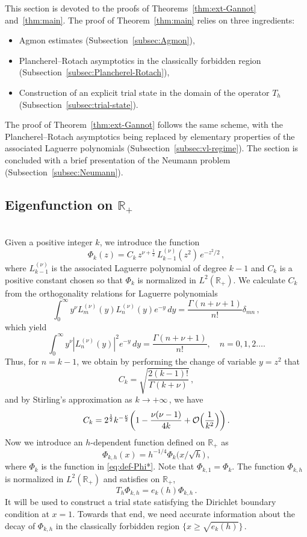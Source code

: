 \documentclass[11pt]{amsart}
\numberwithin{equation}{section}
\theoremstyle{remark}
\newcommand{\R}{\mathbb{R}}
\begin{document}
This section is devoted to the proofs of Theorems~\ref{thm:ext-Gannot} and~\ref{thm:main}. 
The proof of Theorem~\ref{thm:main} relies on three ingredients:
\begin{itemize}
    \item Agmon estimates (Subsection~\ref{subsec:Agmon}),
    \item Plancherel--Rotach asymptotics in the classically forbidden region (Subsection~\ref{subsec:Plancherel-Rotach}),
    \item Construction of an explicit trial state in the domain of the operator $T_h$ (Subsection~\ref{subsec:trial-state}).
\end{itemize}
The proof of Theorem~\ref{thm:ext-Gannot} follows the same scheme, with the Plancherel--Rotach asymptotics being replaced by elementary properties of the associated Laguerre polynomials (Subsection~\ref{subsec:vl-regime}). The section is concluded with a brief presentation of the Neumann problem (Subsection~\ref{subsec:Neumann}).
%
%
\subsection{Eigenfunction on $\mathbb R_+$}\label{subsec:Phi}~\\
Given a positive integer $k$, we introduce the function
    \begin{equation}\label{eq:def-Phi*}
\Phi_k (z) =C_k \, z^{\nu+\frac12}\,L_{k-1}^{(\nu)}(z^2)\, e^{-z^2/2}\,,
    \end{equation}
    where $L_{k-1}^{(\nu)}$ is the associated Laguerre polynomial of degree $k-1$ and $C_k$ is a positive constant  chosen so that $\Phi_k$ is normalized in $L^2(\R_+)$. 
We calculate $C_k$ from the orthogonality relations for Laguerre polynomials
\[
\int_{0}^{\infty} y^{\nu} L_{m}^{(\nu)}(y) L_{n}^{(\nu)}(y) e^{-y} \, dy = \frac{\Gamma(n + \nu + 1)}{n!} \delta_{mn}\,,
\]
which yield
\[\int_{0}^{\infty} y^{\nu} |L_{n}^{(\nu)}(y)|^2 e^{-y} \, dy = \frac{\Gamma(n + \nu + 1)}{n!},\quad n=0,1,2\ldots.\]
Thus, for $n=k-1$, we obtain by performing the change of variable $y=z^2$ that 
\begin{equation}\label{eq:vl-Ck}
C_k=\sqrt{\frac{2(k-1)!}{\Gamma(k+\nu)}}\,,
\end{equation}
and by  Stirling's approximation as $k\to+\infty\,$, we have
 \begin{equation}\label{eq:C-kh}
 C_{k}= 2^{\frac12}k^{-\frac{\nu}{2}}\biggl(1-\frac{\nu(\nu-1)}{4k}+\mathcal O\Bigl(\frac1{k^2}\Bigr)\biggr)\,.
    \end{equation}
%
   Now we introduce an $h$-dependent function defined on $\R_+$ as
    \begin{equation}\label{eq:def-Phi}
    \Phi_{k,h}(x)=h^{-1/4} \Phi_{k} \bigl(x/\sqrt{h}\bigr)\,,
    \end{equation}
where $\Phi_k$ is the function in \eqref{eq:def-Phi*}.     Note that $\Phi_{k,1}=\Phi_k$.  The function $\Phi_{k,h}$ is normalized in $L^2(\R_+)$ and  satisfies on $\mathbb R_+$,
    \[T_h\Phi_{k,h}=e_k(h)\Phi_{k,h}\,.\]
%
It will be used to construct a trial state satisfying the Dirichlet boundary condition at $x=1$. Towards that end, we need accurate information about the decay of $\Phi_{k,h}$ in the classically forbidden region $\{x\geq \sqrt{e_k(h)}\}\,$. 
%
%
%    
\end{document}

